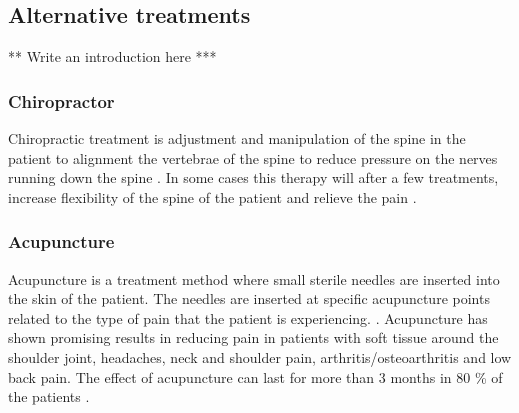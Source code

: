 \subsection{Alternative treatments}
** Write an introduction here *** 

\subsubsection{Chiropractor}
Chiropractic treatment is adjustment and manipulation of the spine in the patient to alignment the vertebrae of the spine to reduce pressure on the nerves running down the spine \cite{Gerald2013}. In some cases this therapy will after a few treatments, increase flexibility of the spine of the patient and relieve the pain \cite{Peterson2012}.



\subsubsection{Acupuncture}
Acupuncture is a treatment method where small sterile needles are inserted into the skin of the patient. The needles are inserted at specific acupuncture points related to the type of pain that the patient is experiencing. \cite{Dhanani2011}. Acupuncture has shown promising results in reducing pain in patients with soft tissue around the shoulder joint, headaches, neck and shoulder pain, arthritis/osteoarthritis and low back pain. The effect of acupuncture can last for more than 3 months in 80 \% of the patients \cite{Junnilla1983}. 


